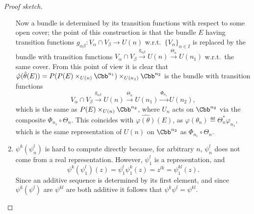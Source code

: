 \begin{proof}[Proof sketch]
\begin{enumerate}
Now a bundle is determined by its transition functions with respect to some open cover; the point of this construction is that the bundle $E$ having transition functions $g_{\alpha \beta}: V_\alpha \cap V_\beta \to U(n)$ w.r.t.\ $\{V_\alpha\}_{\alpha \in I}$ is replaced by the bundle with transition functions $V_\alpha \cap V_\beta \xrightarrow{g_{\alpha \beta}} U(n) \xrightarrow{\Theta_n} U(n_1)$ w.r.t.\ the same cover.
From this point of view it is clear that $\hat \varphi (\hat \theta(E)) = P(P(E) \times_{U(n)} \Cbb^{n_1}) \times_{U(n_1)} \Cbb^{n_2}$ is the bundle with transition functions \[V_\alpha \cap V_\beta \xrightarrow{g_{\alpha \beta}} U(n) \xrightarrow{\Theta_n} U(n_1) \xrightarrow{\Phi_{n_1}} U(n_2),\] which is the same as  $P(E) \times_{U(n)} \Cbb^{n_2}$, where $U_n$ acts on $\Cbb^{n_2}$ via the composite $\Phi_{n_1}\circ\Theta_n$. This coincides with $\widehat{\varphi(\theta)} (E)$, as $\varphi(\theta_n) \eqdef \Theta_n^*\varphi_{n_1}$, which is the same representation of $U(n)$ on $\Cbb^{n_2}$ as $\Phi_{n_1}\circ\Theta_n$.





%
\item $\psi^k(\psi^l_n)$ is hard to compute directly because, for arbitrary $n$, $\psi^l_n$ does not come from a real representation.  However, $\psi^l_1$ is a representation, and \[\psi^k(\psi^l_1)(z) = \psi^l_1 \psi^k_1(z) = z^{lk} = \psi^{kl}_1(z).\]  Since an additive sequence is determined by its first element, and since $\psi^k(\psi^l)$ are $\psi^{kl}$ are both additive it follows that $\psi^k \psi^l = \psi^{kl}$.\qedhere
\end{enumerate}
\end{proof}
